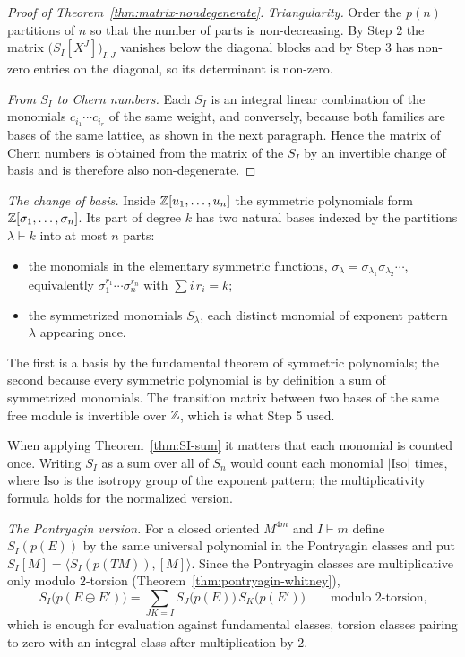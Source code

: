\begin{proof}[Proof of Theorem~\ref{thm:matrix-nondegenerate}]
 \emph{Triangularity.} Order the $p(n)$ partitions of $n$ so that the
number of parts is non-decreasing. By Step 2 the matrix
$\big(S_I[X^J]\big)_{I,J}$ vanishes below the diagonal blocks and by Step 3 has
non-zero entries on the diagonal, so its determinant is non-zero.

 \emph{From $S_I$ to Chern numbers.} Each $S_I$ is an integral linear
combination of the monomials $c_{i_1}\cdots c_{i_r}$ of the same weight, and
conversely, because both families are bases of the same lattice, as shown in the
next paragraph. Hence the matrix of Chern numbers is obtained from the matrix of
the $S_I$ by an invertible change of basis and is therefore also
non-degenerate.
\end{proof}

\medskip\noindent\emph{The change of basis.} Inside $\mathbb{Z}[u_1,\dots,u_n]$ the
symmetric polynomials form $\mathbb{Z}[\sigma_1,\dots,\sigma_n]$. Its part of degree $k$
has two natural bases indexed by the partitions $\lambda\vdash k$ into at most
$n$ parts:

\begin{itemize}
\item the monomials in the elementary symmetric functions,
$\sigma_\lambda=\sigma_{\lambda_1}\sigma_{\lambda_2}\cdots$, equivalently
$\sigma_1^{r_1}\cdots\sigma_n^{r_n}$ with $\sum i\,r_i=k$;
\item the symmetrized monomials $S_\lambda$, each distinct monomial of exponent
pattern $\lambda$ appearing once.
\end{itemize}

The first is a basis by the fundamental theorem of symmetric polynomials; the
second because every symmetric polynomial is by definition a sum of
symmetrized monomials. The transition matrix between two bases of the same free
module is invertible over $\mathbb{Z}$, which is what Step 5 used.

\begin{remark}
When applying Theorem~\ref{thm:SI-sum} it matters that each monomial is counted
once. Writing $S_I$ as a sum over all of $S_n$ would count each monomial
$|\mathrm{Iso}|$ times, where $\mathrm{Iso}$ is the isotropy group of the
exponent pattern; the multiplicativity formula holds for the normalized version.
\end{remark}

\medskip\noindent\emph{The Pontryagin version.} For a closed oriented $M^{4m}$
and $I\vdash m$ define $S_I(p(E))$ by the same universal polynomial in the
Pontryagin classes and put $S_I[M]=\langle S_I(p(TM)),[M]\rangle$. Since the
Pontryagin classes are multiplicative only modulo $2$-torsion
(Theorem~\ref{thm:pontryagin-whitney}),
\[
S_I\big(p(E\oplus E')\big)=\sum_{JK=I}S_J\big(p(E)\big)\,S_K\big(p(E')\big)
\qquad\text{modulo $2$-torsion,}
\]
which is enough for evaluation against fundamental classes, torsion classes
pairing to zero with an integral class after multiplication by $2$.

